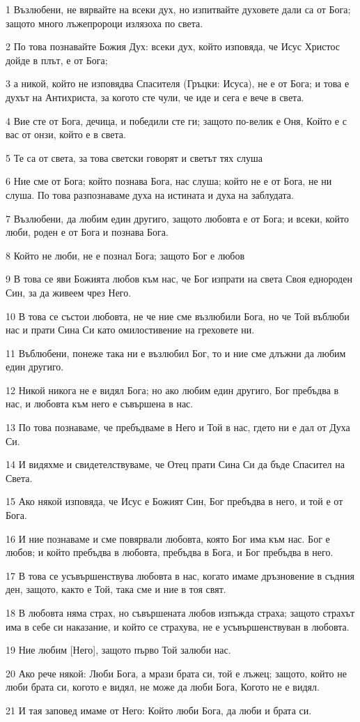 \par 1 Възлюбени, не вярвайте на всеки дух, но изпитвайте духовете дали са от Бога; защото много лъжепророци излязоха по света.
\par 2 По това познавайте Божия Дух: всеки дух, който изповяда, че Исус Христос дойде в плът, е от Бога;
\par 3 а никой, който не изповядва Спасителя (Гръцки: Исуса), не е от Бога; и това е духът на Антихриста, за когото сте чули, че иде и сега е вече в света.
\par 4 Вие сте от Бога, дечица, и победили сте ги; защото по-велик е Оня, Който е с вас от онзи, който е в света.
\par 5 Те са от света, за това светски говорят и светът тях слуша
\par 6 Ние сме от Бога; който познава Бога, нас слуша; който не е от Бога, не ни слуша. По това разпознаваме духа на истината и духа на заблудата.
\par 7 Възлюбени, да любим един другиго, защото любовта е от Бога; и всеки, който люби, роден е от Бога и познава Бога.
\par 8 Който не люби, не е познал Бога; защото Бог е любов
\par 9 В това се яви Божията любов към нас, че Бог изпрати на света Своя еднороден Син, за да живеем чрез Него.
\par 10 В това се състои любовта, не че ние сме възлюбили Бога, но че Той въблюби нас и прати Сина Си като омилостивение на греховете ни.
\par 11 Въблюбени, понеже така ни е възлюбил Бог, то и ние сме длъжни да любим един другиго.
\par 12 Никой никога не е видял Бога; но ако любим един другиго, Бог пребъдва в нас, и любовта към него е съвършена в нас.
\par 13 По това познаваме, че пребъдваме в Него и Той в нас, гдето ни е дал от Духа Си.
\par 14 И видяхме и свидетелствуваме, че Отец прати Сина Си да бъде Спасител на Света.
\par 15 Ако някой изповяда, че Исус е Божият Син, Бог пребъдва в него, и той е от Бога.
\par 16 И ние познаваме и сме повярвали любовта, която Бог има към нас. Бог е любов; и който пребъдва в любовта, пребъдва в Бога, и Бог пребъдва в него.
\par 17 В това се усъвършенствува любовта в нас, когато имаме дръзновение в съдния ден, защото, както е Той, така сме и ние в тоя свят.
\par 18 В любовта няма страх, но съвършената любов изпъжда страха; защото страхът има в себе си наказание, и който се страхува, не е усъвършенствуван в любовта.
\par 19 Ние любим [Него], защото първо Той залюби нас.
\par 20 Ако рече някой: Люби Бога, а мрази брата си, той е лъжец; защото, който не люби брата си, когото е видял, не може да люби Бога, Когото не е видял.
\par 21 И тая заповед имаме от Него: Който люби Бога, да люби и брата си.

